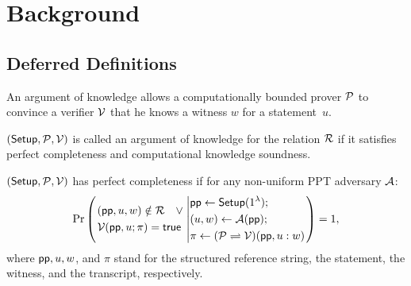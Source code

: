\section{Background}
\label{appx:background}

\subsection{Deferred Definitions}
\label{appx:definitions}
An argument of knowledge allows a computationally bounded prover $\mathcal{P}$ to convince a verifier $\mathcal{V}$ that he knows a witness $w$ for a statement~$u$.
\begin{definition}
	\label{def: argumentOfKnowledge}
	$({\sf Setup}, \mathcal{P}, \mathcal{V})$ is called an argument of knowledge for the relation $\mathcal{R}$ if it satisfies perfect completeness and computational knowledge soundness.
\end{definition}

\begin{definition}
	\label{def: completeness}
	$({\sf Setup}, \mathcal{P}, \mathcal{V})$ has perfect completeness if for any non-uniform PPT adversary $\mathcal{A}$:
	\begin{equation*}
		\Pr
		\left(
			\left.
				\begin{aligned}
					& ({\sf pp}, u, w) \notin \mathcal{R} \quad \vee \\
					& \mathcal{V}({\sf pp}, u; \pi) = {\sf true} \\
				\end{aligned}
			\right.
			\left |
				\begin{aligned}
					& {\sf pp} \leftarrow {\sf Setup}(1^{\lambda}); \\
					& (u, w) \leftarrow \mathcal{A}({\sf pp});\\
					& \pi \leftarrow {(\mathcal{P} \rightleftharpoons \mathcal{V})}({\sf pp}, u: w)
				\end{aligned}
			\right.
		\right)
		= 1,
	\end{equation*}
	where ${\sf pp}, u, w$, and $\pi$ stand for the structured reference string, the statement, the witness, and the transcript, respectively.
\end{definition}

